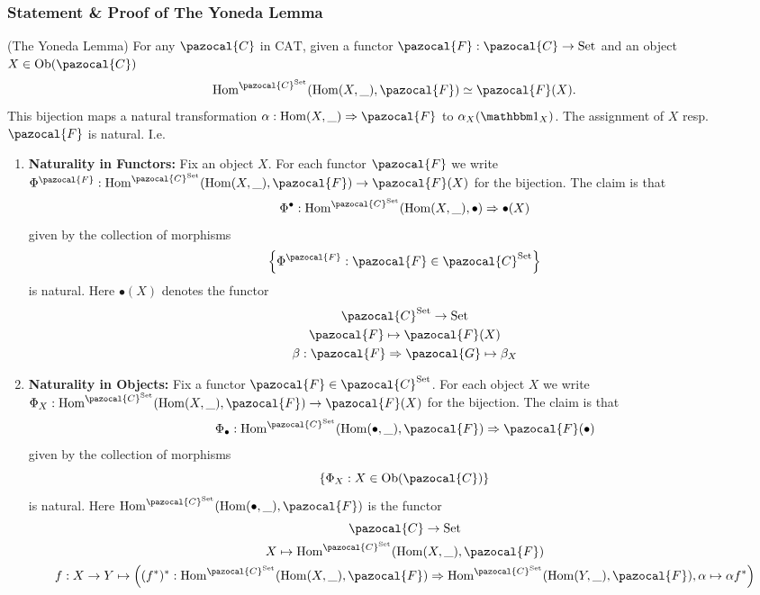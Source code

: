 \subsubsection{Statement \& Proof of The Yoneda Lemma}
\begin{theorem}(The Yoneda Lemma) For any $\pazocal{C}$ in $\mathrm{CAT}$, given a functor $\pazocal{F}:\pazocal{C}\rightarrow \mathrm{Set}$ and an object $X\in \Ob(\pazocal{C})$
$$
    \Hom^{\pazocal{C}^\mathrm{Set}}(\Hom(X,\_),\pazocal{F}) \simeq \pazocal{F}(X).
$$
This bijection maps a natural transformation $\alpha: \Hom(X,\_) \Rightarrow \pazocal{F}$ to $\alpha_X(\fone_X)$. The assignment of $X$ resp. $\pazocal{F}$ is natural. I.e.
\begin{enumerate}
    \item \textbf{Naturality in Functors:} Fix an object $X$. For each functor $\pazocal{F}$ we write $\Phi^{\pazocal{F}} : \Hom^{\pazocal{C}^{\mathrm{Set}}}(\Hom(X,\_),\pazocal{F}) \rightarrow \pazocal{F}(X)$ for the bijection. The claim is that 
    $$\Phi^{\bullet}  : \Hom^{\pazocal{C}^\mathrm{Set}}(\Hom(X,\_),\bullet) \Rightarrow \bullet(X)$$
    given by the collection of morphisms
    $$\left\{\Phi^\pazocal{F} : \pazocal{F} \in \pazocal{C}^\mathrm{Set}\right\}$$
    is natural. Here $\bullet(X)$ denotes the functor 
    \begin{gather*}
        \pazocal{C}^\mathrm{Set} \rightarrow \mathrm{Set}\\
        \pazocal{F} \mapsto \pazocal{F}(X)\\
        \beta : \pazocal{F}\Rightarrow \pazocal{G} \mapsto \beta_X
    \end{gather*}
    \item \textbf{Naturality in Objects:} Fix a functor $\pazocal{F}\in \pazocal{C}^\mathrm{Set}$. For each object $X$ we write $\Phi_X : \Hom^{\pazocal{C}^\mathrm{Set}}(\Hom(X,\_),\pazocal{F}) \rightarrow \pazocal{F}(X)$ for the bijection. The claim is that 
    $$\Phi_\bullet : \Hom^{\pazocal{C}^\mathrm{Set}}(\Hom(\bullet,\_),\pazocal{F})\Rightarrow \pazocal{F}(\bullet)$$
    given by the collection of morphisms
    $$\left\{ \Phi_X : X\in \Ob(\pazocal{C})\right\}$$
    is natural. Here $\Hom^{\pazocal{C}^\mathrm{Set}}(\Hom(\bullet,\_),\pazocal{F})$ is the functor 
    \begin{gather*}
        \pazocal{C}\rightarrow \mathrm{Set}\\
        X \mapsto \Hom^{\pazocal{C}^\mathrm{Set}}(\Hom(X,\_),\pazocal{F})\\
        f : X\rightarrow Y \mapsto \left((f^\ast)^\ast: \Hom^{\pazocal{C}^\mathrm{Set}}(\Hom(X,\_),\pazocal{F}) \Rightarrow \Hom^{\pazocal{C}^\mathrm{Set}}(\Hom(Y,\_),\pazocal{F}),\alpha \mapsto \alpha f^\ast\right)
    \end{gather*}

\end{enumerate}
\end{theorem}
